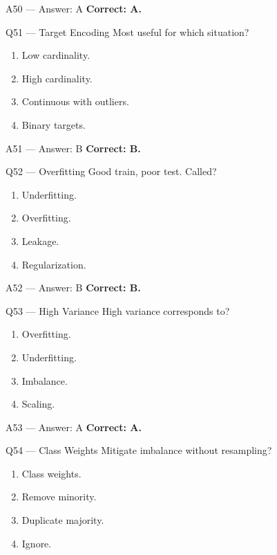\documentclass[aspectratio=169,9pt]{beamer}
\begin{document}
	\begin{frame}{A50 — Answer: A}
		\textbf{Correct: A.}
	\end{frame}
	
	\begin{frame}{Q51 — Target Encoding}
		Most useful for which situation?
		\begin{enumerate}[label=\Alph*.]
			\item Low cardinality.
			\item High cardinality.
			\item Continuous with outliers.
			\item Binary targets.
		\end{enumerate}
	\end{frame}
	
	\begin{frame}{A51 — Answer: B}
		\textbf{Correct: B.}
	\end{frame}
	
	\begin{frame}{Q52 — Overfitting}
		Good train, poor test. Called?
		\begin{enumerate}[label=\Alph*.]
			\item Underfitting.
			\item Overfitting.
			\item Leakage.
			\item Regularization.
		\end{enumerate}
	\end{frame}
	
	\begin{frame}{A52 — Answer: B}
		\textbf{Correct: B.}
	\end{frame}
	
	\begin{frame}{Q53 — High Variance}
		High variance corresponds to?
		\begin{enumerate}[label=\Alph*.]
			\item Overfitting.
			\item Underfitting.
			\item Imbalance.
			\item Scaling.
		\end{enumerate}
	\end{frame}
	
	\begin{frame}{A53 — Answer: A}
		\textbf{Correct: A.}
	\end{frame}
	
	\begin{frame}{Q54 — Class Weights}
		Mitigate imbalance without resampling?
		\begin{enumerate}[label=\Alph*.]
			\item Class weights.
			\item Remove minority.
			\item Duplicate majority.
			\item Ignore.
		\end{enumerate}
	\end{frame}
	
\end{document}
